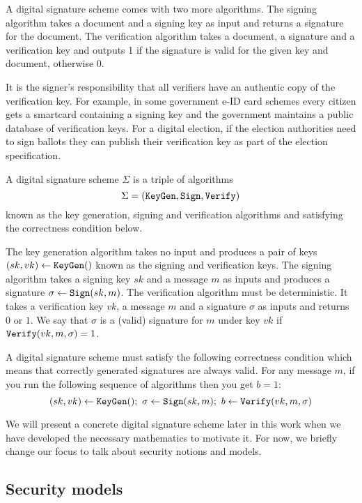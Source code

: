 \documentclass{llncs}
\newcommand{\alg}[1]{\textup{\texttt{#1}}}
\begin{document}
A digital signature scheme comes with two more algorithms. The signing algorithm
takes a document and a signing key as input and returns a signature for the
document. The verification algorithm takes a document, a signature and a
verification key and outputs 1 if the signature is valid for the given key and
document, otherwise 0.

It is the signer's responsibility that all verifiers have an authentic copy of
the verification key. For example, in some government e-ID card schemes every
citizen gets a smartcard containing a signing key and the government maintains a
public database of verification keys. For a digital election, if the election
authorities need to sign ballots they can publish their verification key as part
of the election specification.

\begin{definition}
A digital signature scheme $\Sigma$ is a triple of algorithms
\[
\Sigma = \left( \alg{KeyGen}, \alg{Sign}, \alg{Verify} \right)
\]
known as the key generation, signing and verification algorithms and satisfying
the correctness condition below.

The key generation algorithm takes no input and produces a pair of keys $(sk,
vk) \gets \alg{KeyGen}()$ known as the signing and verification keys. The
signing algorithm takes a signing key $sk$ and a message $m$ as inputs and
produces a signature $\sigma \gets \alg{Sign}(sk, m)$. The verification
algorithm must be deterministic. It takes a verification key $vk$, a message $m$
and a signature $\sigma$ as inputs and returns $0$ or $1$. We say that $\sigma$
is a (valid) signature for $m$ under key $vk$ if $\alg{Verify}(vk, m, \sigma) =
1$.

A digital signature scheme must satisfy the following correctness condition
which means that correctly generated signatures are always valid. For any
message $m$, if you run the following sequence of algorithms then you get $b =
1$:
\[
(sk, vk) \gets \alg{KeyGen}();\ \sigma \gets \alg{Sign}(sk, m);\ b \gets \alg{Verify}(vk, m, \sigma)
\]
\end{definition}

We will present a concrete digital signature scheme later in this work when we
have developed the necessary mathematics to motivate it. For now, we briefly
change our focus to talk about security notions and models.

\subsection{Security models}
\end{document}

